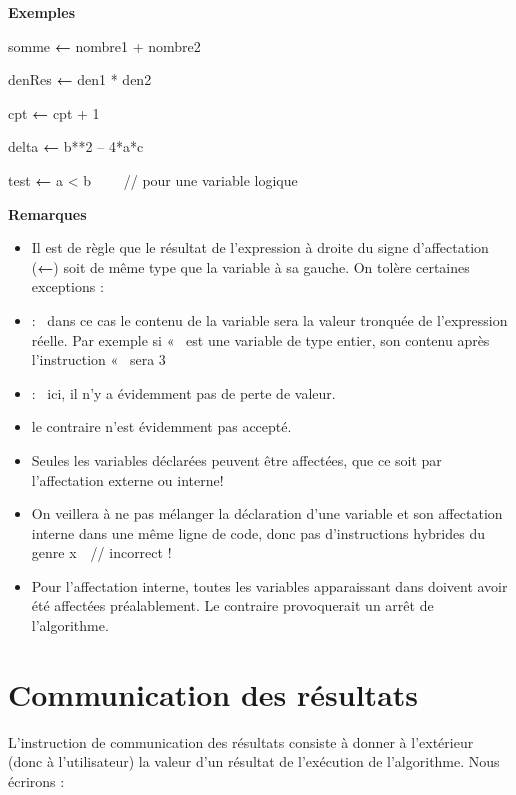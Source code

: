 {\bfseries
Exemples}

{\sffamily
somme {\textbf{←}} nombre1 + nombre2}

{\sffamily
denRes {\textbf{←}} den1 * den2}

{\sffamily
cpt {\textbf{←}} cpt + 1}

{\sffamily
delta {\textbf{←}} b**2 – 4*a*c}

{\sffamily
test {\textbf{←}} a {\textless} b \ \ \ \ //
pour une variable logique}

{\bfseries
Remarques}

\liststyleListv
\begin{itemize}
\item {
Il est de règle que le résultat de l’expression à droite du signe
d’affectation ({\textsf{\textbf{←}}}) soit de
même type que la variable à sa gauche. On tolère certaines exceptions
:}
\item {
 : \ dans ce cas le contenu de la variable sera la valeur tronquée
de l’expression réelle. Par exemple si «~ est
une variable de type entier, son contenu après l’instruction
«~ sera 3}
\item {
 : \ ici, il n'y a évidemment pas de perte de
valeur.}
\item {
 le contraire n'est évidemment pas
accepté.}
\item {
Seules les variables déclarées peuvent être affectées, que ce soit par
l’affectation externe ou interne!}
\item {
On veillera à ne pas mélanger la déclaration d’une variable et son
affectation interne dans une même ligne de code, donc pas
d’instructions hybrides du genre \textsf{x}\textstyleCodeInsr{
}\ \ // incorrect !}
\item {
Pour l’affectation interne, toutes les variables apparaissant dans
 doivent avoir été affectées
préalablement. Le contraire provoquerait un arrêt de l’algorithme.}
\end{itemize}
\section{Communication des résultats}
{
L’instruction de communication des résultats consiste à donner à
l’extérieur (donc à l’utilisateur) la valeur d’un résultat de
l’exécution de l’algorithme. Nous écrirons :}

